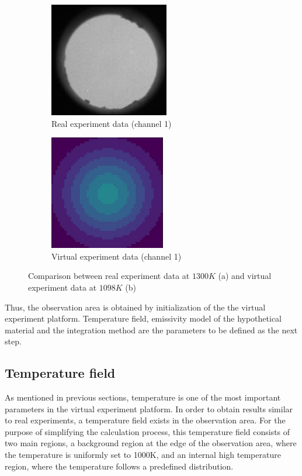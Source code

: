 \begin{figure}[htbp]
    \centering
    \begin{subfigure}{0.45\textwidth}
        \centering
        \includegraphics[height=5cm]{figures/real_camera_1075.JPG}
        \caption{Real experiment data  (channel 1)}
        \label{fig: real_camera}
    \end{subfigure}
    \begin{subfigure}{0.45\textwidth}
        \centering
        \includegraphics[height=5cm]{figures/virtual_camera_1098.jpg}
        \caption{Virtual experiment data (channel 1)}
        \label{fig: virtual_camera}
    \end{subfigure}
    \caption{Comparison between real experiment data at $1300K$ (a)
    and virtual experiment data at $1098K$ (b)
    }
    \label{fig: camera}
\end{figure}


Thus, the observation area is obtained by initialization of the the virtual 
experiment platform. Temperature field, emissivity model of the hypothetical 
material and the integration method are the parameters to be defined as the next
step.


\subsection{Temperature field}%
As mentioned in previous sections, temperature is one of the most important parameters 
in the virtual experiment platform. In order to obtain results similar to real 
experiments, a temperature field exists in the observation area. For the purpose of 
simplifying the calculation process, this temperature field consists of two main 
regions, a background region at the edge of the observation area, 
where the temperature is uniformly set to 1000K, and an internal high temperature 
region, where the temperature follows a predefined distribution.


